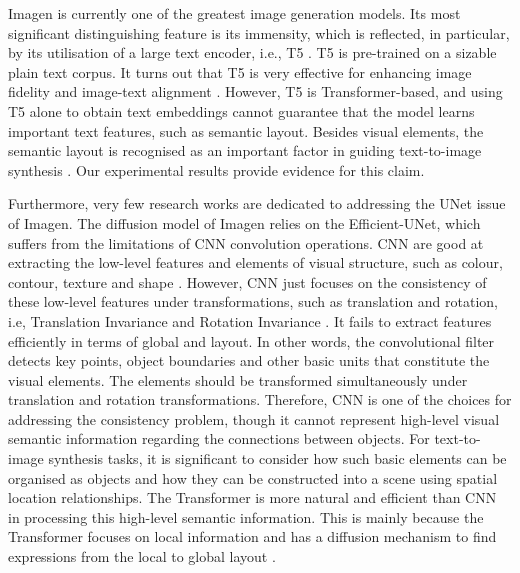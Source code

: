 \documentclass{article}
\begin{document}
Imagen is currently one of the greatest image generation models. Its most significant distinguishing feature is its immensity, which is reflected, in particular, by its utilisation of a large text encoder,  i.e., T5 \cite{Raffel2020ExploringTL}. T5 is pre-trained on a sizable plain text corpus. It turns out that T5 is very effective for enhancing image fidelity and image-text alignment \cite{Saharia2022PhotorealisticTD}. However, T5 is Transformer-based, and using T5 alone to obtain text embeddings cannot guarantee that the model learns important text features, such as semantic layout. Besides visual elements, the semantic layout is recognised as an important factor in guiding text-to-image synthesis \cite{Li2019ObjectDrivenTS}. Our experimental results provide evidence for this claim. 

Furthermore, very few research works are dedicated to addressing the UNet issue of Imagen. The diffusion model of Imagen relies on the Efficient-UNet, which suffers from the limitations of CNN convolution operations. CNN are good at extracting the low-level features and elements of visual structure, such as colour, contour, texture and shape \cite{ganar2014enhancement}. However, CNN just focuses on the consistency of these low-level features under transformations, such as translation and rotation, i.e, Translation Invariance \cite{kauderer2017quantifying} and Rotation Invariance \cite{chidester2018rotation}. It fails to extract features efficiently in terms of global and layout. In other words, the convolutional filter detects key points, object boundaries and other basic units that constitute the visual elements. The elements should be transformed simultaneously under translation and rotation transformations. Therefore, CNN is one of the choices for addressing the consistency problem, though it cannot represent high-level visual semantic information regarding the connections between objects. For text-to-image synthesis tasks, it is significant to consider how such basic elements can be organised as objects and how they can be constructed into a scene using spatial location relationships. The Transformer is more natural and efficient than CNN in processing this high-level semantic information. This is mainly because the Transformer focuses on local information and has a diffusion mechanism to find expressions from the local to global layout \cite{li2021local,liang2022local}. 
\end{document}
